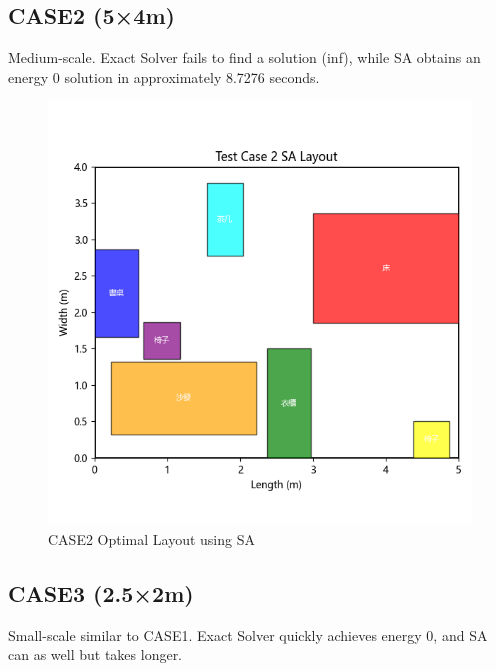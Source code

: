 \documentclass[conference]{IEEEtran}
\begin{document}
\FloatBarrier %

\subsection{CASE2 (5×4m)}
Medium-scale. Exact Solver fails to find a solution (inf), while SA obtains an energy 0 solution in approximately 8.7276 seconds.

\begin{figure}[!htbp]
    \centering
    \includegraphics[width=0.8\columnwidth]{sa_layout_test_case_2.png} 
    \caption{CASE2 Optimal Layout using SA}
    \label{fig:case2_sa}
\end{figure}

\FloatBarrier %

\subsection{CASE3 (2.5×2m)}
Small-scale similar to CASE1. Exact Solver quickly achieves energy 0, and SA can as well but takes longer.
\end{document}
